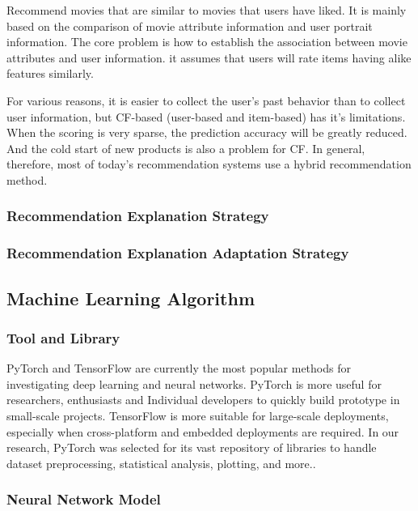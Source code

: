 \begin{itemize}
\par Recommend movies that are similar to movies that users have liked. It is mainly based on the comparison of movie attribute information and user portrait information. The core problem is how to establish the association between movie attributes and user information. it assumes that users will rate items having alike features similarly\cite{safoury2013exploiting}.

\end{itemize}

\par For various reasons, it is easier to collect the user's past behavior than to collect user information, but CF-based (user-based and item-based) has it's limitations. When the scoring is very sparse, the prediction accuracy will be greatly reduced. And the cold start of new products is also a problem for CF. In general, therefore, most of today's recommendation systems use a hybrid recommendation method.
\subsubsection{Recommendation Explanation Strategy}
\subsubsection{Recommendation Explanation Adaptation Strategy}

\subsection{Machine Learning Algorithm}

\subsubsection{Tool and Library}
PyTorch\cite{ketkar2017introduction} and TensorFlow\cite{abadi2016tensorflow} are currently the most popular methods for investigating deep learning and neural networks. PyTorch is more useful for researchers, enthusiasts and Individual developers to quickly build prototype in small-scale projects. TensorFlow is more suitable for large-scale deployments, especially when cross-platform and embedded deployments are required. In our research, PyTorch was selected for its vast repository of libraries to handle dataset preprocessing, statistical analysis, plotting, and more.\cite{paszke2019pytorch}.

\subsubsection{Neural Network Model}
